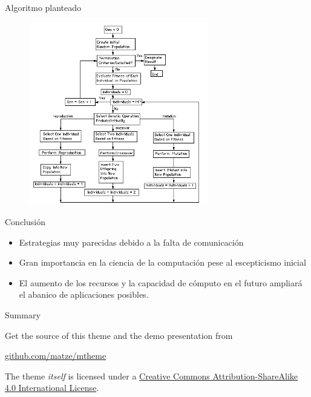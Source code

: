 \documentclass[10pt]{beamer}
\begin{document}
\begin{frame}{Algoritmo planteado}

 \begin{figure}[H]
  \centering
  \includegraphics[width=0.7\textwidth]{imgs/FlowchartGP.PNG}
  \label{fig:dfd:1}
\end{figure}
  
\end{frame}


\begin{frame}{Conclusión}

 \begin{itemize}\itemsep2pt
  \item Estrategias muy parecidas debido a la falta de comunicación
  \item Gran importancia en la ciencia de la computación pese al escepticismo inicial
  \item El aumento de los recursos y la capacidad de cómputo en el futuro ampliará el abanico de aplicaciones posibles.
  \end{itemize}

  
\end{frame}

\begin{frame}{Summary}

  Get the source of this theme and the demo presentation from

  \begin{center}\url{github.com/matze/mtheme}\end{center}

  The theme \emph{itself} is licensed under a
  \href{http://creativecommons.org/licenses/by-sa/4.0/}{Creative Commons
  Attribution-ShareAlike 4.0 International License}.

  \begin{center}\ccbysa\end{center}

\end{frame}
\end{document}
